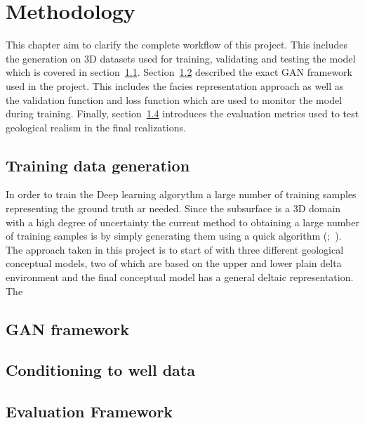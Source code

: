 \chapter{Methodology}\label{Ch:Methodology}
This chapter aim to clarify the complete workflow of this project. This includes the generation on 3D datasets used for training, validating and testing the model which is covered in section~\ref{Sec:data_gen}. Section~\ref{Sec:GAN_framew} described the exact GAN framework used in the project. This includes the facies representation approach as well as the validation function and loss function which are used to monitor the model during training. Finally, section~\ref{Sec:eval} introduces the evaluation metrics used to test geological realism in the final realizations.
\section{Training data generation}\label{Sec:data_gen}
In order to train the Deep learning algorythm a large number of training samples representing the ground truth ar needed. Since the subsurface is a 3D domain with a high degree of uncertainty the current method to obtaining a large number of training samples is by simply generating them using a quick algorithm (\cite{rongier2025atowards};~\cite{sun2023geological}). The approach taken in this project is to start of with three different geological conceptual models, two of which are based on the upper and lower plain delta environment and the final conceptual model has a general deltaic representation. The 

\section{GAN framework}\label{Sec:GAN_framew}

\section{Conditioning to well data}\label{Sec:Inversion}

\section{Evaluation Framework}\label{Sec:eval}